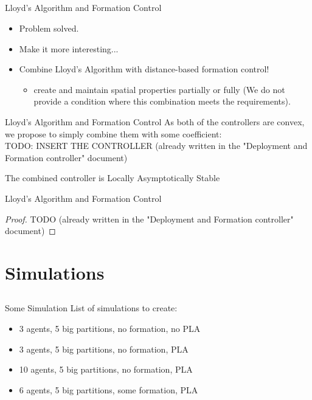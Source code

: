 \documentclass[t]{beamer}
\begin{document}
\subsection[Lloyd's Algorithm and Formation Control]{}
\begin{frame}[label=lloydsandformation1]{Lloyd's Algorithm and Formation Control}
\begin{itemize}
\item<1-> Problem solved.
\item<2-> Make it more interesting...
\item<3-> Combine Lloyd's Algorithm with distance-based formation control! \begin{itemize}
\item<4-> create and maintain spatial properties partially or fully (We do not provide a condition where this combination meets the requirements).
\end{itemize}
\end{itemize}
\end{frame}

\begin{frame}[label=lloydsandformation2]{Lloyd's Algorithm and Formation Control}
As both of the controllers are convex, we propose to simply combine them with some coefficient:\\
TODO: INSERT THE CONTROLLER (already written in the "Deployment and Formation controller" document)
\pause
\begin{theorem}
The combined controller is Locally Asymptotically Stable
\end{theorem}
\end{frame}

\begin{frame}[label=lloydsandformation3]{Lloyd's Algorithm and Formation Control}
\begin{proof}
TODO (already written in the "Deployment and Formation controller" document)
\end{proof}
\end{frame}




\section[Simulations]{Simulations}
\subsection[Some Simulation]{}
\begin{frame}[label=sl3]{Some Simulation}
List of simulations to create:
\begin{itemize}
\item 3 agents, 5 big partitions, no formation, no PLA
\item 3 agents, 5 big partitions, no formation, PLA
\item 10 agents, 5 big partitions, no formation, PLA
\item 6 agents, 5 big partitions, some formation, PLA
\end{itemize}
\end{frame}
\end{document}
